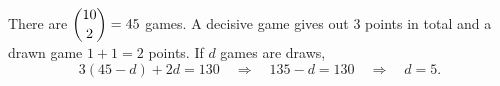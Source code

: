 There are $\dbinom{10}{2}=45$ games. A decisive game gives out $3$ points in total and a drawn game $1+1=2$ points. If $d$ games are draws,
\[
3(45-d)+2d=130\quad\Longrightarrow\quad 135-d=130\quad\Longrightarrow\quad d=\boxed{5}.
\]
